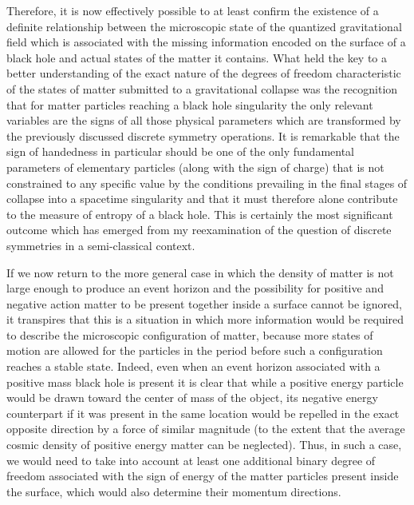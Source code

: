 \documentclass[notitlepage,12pt]{report}
\begin{document}
Therefore, it is now effectively possible to at least confirm the existence of a definite relationship between the microscopic state of the quantized gravitational field which is associated with the missing information encoded on the surface of a black hole and actual states of the matter it contains. What held the key to a better understanding of the exact nature of the degrees of freedom characteristic of the states of matter submitted to a gravitational collapse was the recognition that for matter particles reaching a black hole singularity the only relevant variables are the signs of all those physical parameters which are transformed by the previously discussed discrete symmetry operations. It is remarkable that the sign of handedness in particular should be one of the only fundamental parameters of elementary particles (along with the sign of charge) that is not constrained to any specific value by the conditions prevailing in the final stages of collapse into a spacetime singularity and that it must therefore alone contribute to the measure of entropy of a black hole. This is certainly the most significant outcome which has emerged from my reexamination of the question of discrete symmetries in a semi-classical context.

\bigskip

\noindent If we now return to the more general case in which the density of matter is not large enough to produce an event horizon and the possibility for positive and negative action matter to be present together inside a surface cannot be ignored, it transpires that this is a situation in which more information would be required to describe the microscopic configuration of matter, because more states of motion are allowed for the particles in the period before such a configuration reaches a stable state. Indeed, even when an event horizon associated with a positive mass black hole is present it is clear that while a positive energy particle would be drawn toward the center of mass of the object, its negative energy counterpart if it was present in the same location would be repelled in the exact opposite direction by a force of similar magnitude (to the extent that the average cosmic density of positive energy matter can be neglected). Thus, in such a case, we would need to take into account at least one additional binary degree of freedom associated with the sign of energy of the matter particles present inside the surface, which would also determine their momentum directions.
\end{document}
